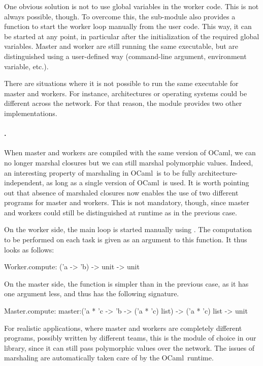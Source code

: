 \documentclass{llncs}
\newcommand{\Ocaml}{OCaml}
\begin{document}
  One obvious solution is not to use global variables in the worker
  code. This is not always possible, though.  To overcome this, the
   sub-module also provides a  function to
  start the worker loop manually from the user code. This way, it can
  be started at any point, in particular after the initialization of
  the required global variables.  Master and worker are still running
  the same executable, but are distinguished using a user-defined way
  (command-line argument, environment variable, etc.).

  There are situations where it is not possible to run the
  same executable for master and workers.  For instance, architectures
  or operating systems could be different across the network.  For
  that reason, the  module provides two other
  implementations.

  \paragraph{.} When master and workers are compiled with the
  same version of \Ocaml, we can no longer marshal closures but we can
  still marshal polymorphic values. Indeed, an interesting property of
  marshaling in \Ocaml\ is to be fully architecture-independent, as
  long as a single version of \Ocaml\ is used. It is worth pointing
  out that absence of marshaled closures now enables the use of two
  different programs for master and workers. This is not mandatory,
  though, since master and workers could still be distinguished at
  runtime as in the previous case.

  On the worker side, the main loop is started manually using
  . The computation to be performed on each task is
  given as an argument to this function. It thus looks as follows:
  \begin{ocaml}
    Worker.compute: ('a -> 'b) -> unit -> unit
  \end{ocaml}
  On the master side, the  function is simpler than in the
  previous case, as it has one argument less, and thus has the
  following signature.
  \begin{ocaml}
    Master.compute: 
      master:('a * 'c -> 'b -> ('a * 'c) list) -> ('a * 'c) list -> unit
  \end{ocaml}
  For realistic applications, where master and workers are completely
  different programs, possibly written by different teams, this is the
  module of choice in our library, since it can still pass polymorphic
  values over the network. The issues of marshaling are automatically
  taken care of by the \Ocaml\ runtime.
\end{document}
